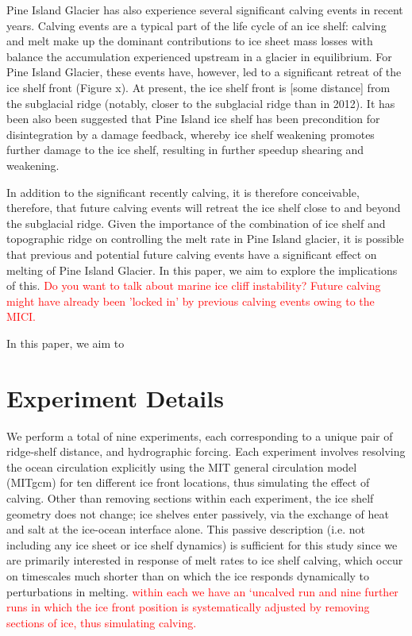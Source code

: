 \documentclass[draft]{agujournal2019}
\newcommand{\red}[1]{\textcolor{red}{#1}}
\begin{document}
Pine Island Glacier has also experience several significant calving events in recent years. Calving events are a typical part of the life cycle of an ice shelf: calving and melt make up the dominant contributions to ice sheet mass losses with balance the accumulation experienced upstream in a glacier in equilibrium. For Pine Island Glacier, these events have, however, led to a significant retreat of the ice shelf front (Figure x). At present, the ice shelf front is [some distance] from the subglacial ridge (notably, closer to the subglacial ridge than in 2012). It has been also been suggested that Pine Island ice shelf has been precondition for disintegration by a damage feedback, whereby ice shelf weakening promotes further damage to the ice shelf, resulting in further speedup shearing and weakening. 

In addition to the significant recently calving, it is therefore conceivable, therefore, that future calving events will retreat the ice shelf close to and beyond the subglacial ridge. Given the importance of the combination of ice shelf and topographic ridge on controlling the melt rate in Pine Island glacier, it is possible that previous and potential future calving events have a significant effect on melting of Pine Island Glacier. In this paper, we aim to explore the implications of this.
\red{Do you want to talk about marine ice cliff instability? Future calving might have already been 'locked in' by previous calving events owing to the MICI.}

In this paper, we aim to 

\section{Experiment Details}
We perform a total of nine experiments, each corresponding to a unique pair of ridge-shelf distance, and hydrographic forcing. Each experiment involves resolving the ocean circulation explicitly using the MIT general circulation model (MITgcm) for ten different ice front locations, thus simulating the effect of calving. Other than removing sections within each experiment, the ice shelf geometry does not change; ice shelves enter passively, via the exchange of heat and salt at the ice-ocean interface alone. This passive description (i.e. not including any ice sheet or ice shelf dynamics) is sufficient for this study since we are primarily interested in response of melt rates to ice shelf calving, which occur on timescales much shorter than on which the ice responds dynamically to perturbations in melting. \red{within each we have an `uncalved run and nine further runs in which the ice front position is systematically adjusted by removing sections of ice, thus simulating calving.}
\end{document}
